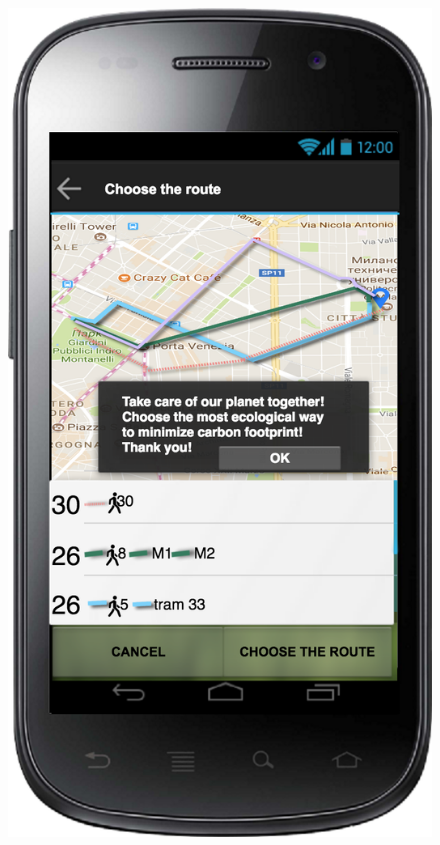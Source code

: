 \documentclass[a4paper,leqno]{article}
\begin{document}
\begin{figure}
\begin{minipage}[!h]{0.45\linewidth}
		\centering
		\includegraphics[scale = 0.15]{buildRoute.png}
	\end{minipage}
\end{figure}
\end{document}
